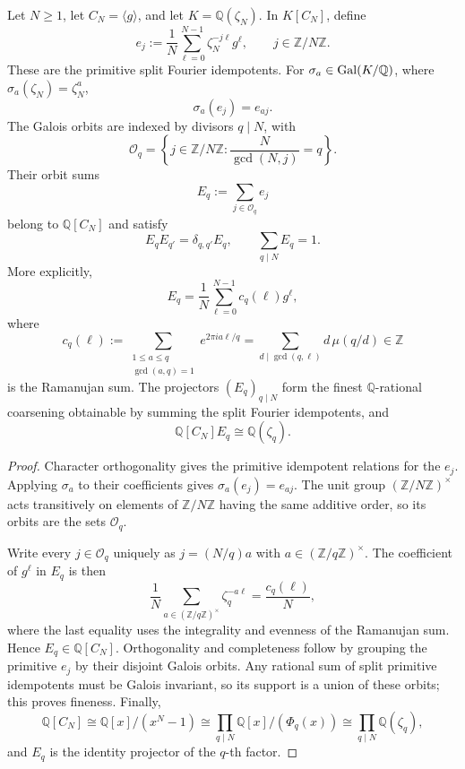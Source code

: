 \begin{proposition}
\label{prop:block16-rational-cyclotomic-orbit-lanes}
Let \(N\ge1\), let \(C_N=\langle g\rangle\), and let
\(K=\mathbb Q(\zeta_N)\).  In \(K[C_N]\), define
\[
 e_j
 :=
 \frac1N\sum_{\ell=0}^{N-1}
 \zeta_N^{-j\ell}g^\ell,
 \qquad j\in\mathbb Z/N\mathbb Z.
\]
These are the primitive split Fourier idempotents.  For
\(\sigma_a\in\operatorname{Gal}(K/\mathbb Q)\), where
\(\sigma_a(\zeta_N)=\zeta_N^a\),
\[
 \sigma_a(e_j)=e_{aj}.
\]
The Galois orbits are indexed by divisors \(q\mid N\), with
\[
 \mathcal O_q
 =
 \left\{j\in\mathbb Z/N\mathbb Z:
 \frac{N}{\gcd(N,j)}=q\right\}.
\]
Their orbit sums
\[
 E_q:=\sum_{j\in\mathcal O_q}e_j
\]
belong to \(\mathbb Q[C_N]\) and satisfy
\[
 E_qE_{q'}=\delta_{q,q'}E_q,
 \qquad
 \sum_{q\mid N}E_q=1.
\]
More explicitly,
\[
 \boxed{
 E_q
 =
 \frac1N\sum_{\ell=0}^{N-1}c_q(\ell)g^\ell,}
\]
where
\[
 c_q(\ell)
 :=
 \sum_{\substack{1\le a\le q\\\gcd(a,q)=1}}
 e^{2\pi i a\ell/q}
 =
 \sum_{d\mid\gcd(q,\ell)}d\,\mu(q/d)
 \in\mathbb Z
\]
is the Ramanujan sum.  The projectors \((E_q)_{q\mid N}\) form the finest
\(\mathbb Q\)-rational coarsening obtainable by summing the split Fourier
idempotents, and
\[
 \mathbb Q[C_N]E_q\cong\mathbb Q(\zeta_q).
\]
\end{proposition}

\begin{proof}
Character orthogonality gives the primitive idempotent relations for the
\(e_j\).  Applying \(\sigma_a\) to their coefficients gives
\(\sigma_a(e_j)=e_{aj}\).  The unit group
\((\mathbb Z/N\mathbb Z)^\times\) acts transitively on elements of
\(\mathbb Z/N\mathbb Z\) having the same additive order, so its orbits are the
sets \(\mathcal O_q\).

Write every \(j\in\mathcal O_q\) uniquely as
\(j=(N/q)a\) with \(a\in(\mathbb Z/q\mathbb Z)^\times\).  The coefficient of
\(g^\ell\) in \(E_q\) is then
\[
 \frac1N
 \sum_{a\in(\mathbb Z/q\mathbb Z)^\times}
 \zeta_q^{-a\ell}
 =
 \frac{c_q(\ell)}{N},
\]
where the last equality uses the integrality and evenness of the Ramanujan
sum.  Hence \(E_q\in\mathbb Q[C_N]\).  Orthogonality and completeness follow
by grouping the primitive \(e_j\) by their disjoint Galois orbits.  Any rational
sum of split primitive idempotents must be Galois invariant, so its support is a
union of these orbits; this proves fineness.  Finally,
\[
 \mathbb Q[C_N]
 \cong
 \mathbb Q[x]/(x^N-1)
 \cong
 \prod_{q\mid N}\mathbb Q[x]/(\Phi_q(x))
 \cong
 \prod_{q\mid N}\mathbb Q(\zeta_q),
\]
and \(E_q\) is the identity projector of the \(q\)-th factor.
\end{proof}

